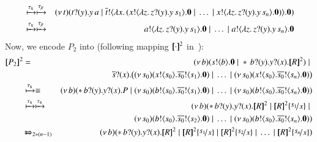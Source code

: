 \documentclass[preprint,11pt]{elsarticle}
\begin{document}
{\begin{eqnarray*}
	& \xmapsto{\tau_{\mathsf{s}}} \xmapsto{\tau_{\beta}} & 
	(\nu\, t)(t ? (y) . y\, {a} \;|\; \overline{t} ! \langle \lambda x.\,(x ! \langle \lambda z.\,z ? (y) . y\, {s_1} \rangle . \mathbf{0} \;|\; \dots \;|\; x ! \langle \lambda z.\,z ? (y) . y\, {s_n} \rangle . \mathbf{0}) \rangle . \mathbf{0})\\
	& \xmapsto{\tau_{\mathsf{s}}}\xmapsto{\tau_{\beta}}  & 
	a ! \langle \lambda z.\,z ? (y) . y\, {s_1} \rangle . \mathbf{0} \;|\; \dots \;|\; a ! \langle \lambda z.\,z ? (y) . y\, {s_n} \rangle . \mathbf{0}
\end{eqnarray*}
Now, we encode $P_2$ into \sessp (following mapping $[\!\![\cdot]\!\!]^2$ in~):
\begin{eqnarray*}
\pmap{P_2}{2} & = & 	\newsp{b}{\bout{s}{b} \inact \Par \repl \binp{b}{y} \binp{y}{x} \pmap{R}{2}} \Par \\
& & \qquad \qquad \binp{\dual{s}}{x} \big(\newsp{s_0}{\bout{x}{s_0} \bout{\dual{s_0}}{s_1} \inact} \Par \dots \Par \newsp{s_0}{\bout{x}{s_0} \bout{\dual{s_0}}{s_n}\inact}\big)
	\\
	& \hby{\stau} \equiv & 
	\newsp{b}{\repl \binp{b}{y} \binp{y}{x} P \Par \newsp{s_0}{\bout{b}{s_0} \bout{\dual{s_0}}{s_1} \inact} \Par \dots \Par \newsp{s_0}{\bout{b}{s_0} \bout{\dual{s_0}}{s_n} \inact}}
	\\
	& \hby{\stau}  \hby{\stau}   & 
	\newsp{b}{\repl \binp{b}{y} \binp{y}{x} \pmap{R}{2} \Par \pmap{R}{2}\subst{s_1}{x} \Par 
	\\
	&  & \qquad \qquad \newsp{s_0}{\bout{b}{s_0} \bout{\dual{s_0}}{s_2} \inact} \Par \dots \Par \newsp{s_0}{\bout{b}{s_0} \bout{\dual{s_0}}{s_n} \inact}}
	\\
	& \Hby{}_{2*(n - 1)} & 
	\newsp{b}{\repl \binp{b}{y} \binp{y}{x} \pmap{R}{2} \Par \pmap{R}{2}\subst{s_1}{x} \Par \pmap{R}{2}\subst{s_2}{x} \Par \dots \Par \pmap{R}{2}\subst{s_n}{x}}
\end{eqnarray*}
}
\end{document}
